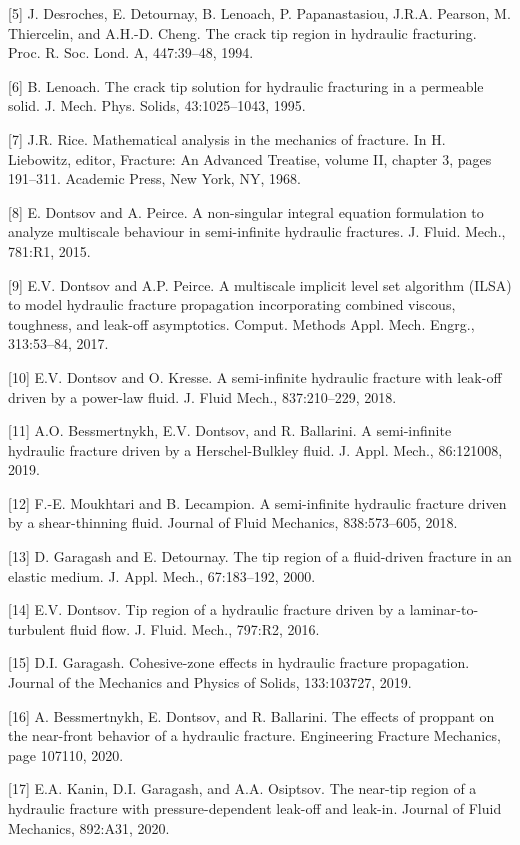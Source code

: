 \documentclass[main.tex]{subfiles}
\begin{document}
[5] J. Desroches, E. Detournay, B. Lenoach, P. Papanastasiou, J.R.A. Pearson, M. Thiercelin, and A.H.-D. Cheng. The crack tip region in hydraulic fracturing. Proc. R. Soc. Lond. A, 447:39–48, 1994.

[6] B. Lenoach. The crack tip solution for hydraulic fracturing in a permeable solid. J. Mech. Phys. Solids, 43:1025–1043, 1995.

[7] J.R. Rice. Mathematical analysis in the mechanics of fracture. In H. Liebowitz, editor, Fracture: An Advanced Treatise, volume II, chapter 3, pages 191–311. Academic Press, New York, NY, 1968.

[8] E. Dontsov and A. Peirce. A non-singular integral equation formulation to analyze multiscale behaviour in semi-infinite hydraulic fractures. J. Fluid. Mech., 781:R1, 2015.

[9] E.V. Dontsov and A.P. Peirce. A multiscale implicit level set algorithm (ILSA) to model hydraulic fracture propagation incorporating combined viscous, toughness, and leak-off asymptotics. Comput. Methods Appl. Mech. Engrg., 313:53–84, 2017.

[10] E.V. Dontsov and O. Kresse. A semi-infinite hydraulic fracture with leak-off driven by a power-law fluid. J. Fluid Mech., 837:210–229, 2018.

[11] A.O. Bessmertnykh, E.V. Dontsov, and R. Ballarini. A semi-infinite hydraulic fracture driven by a Herschel-Bulkley fluid. J. Appl. Mech., 86:121008, 2019.

[12] F.-E. Moukhtari and B. Lecampion. A semi-infinite hydraulic fracture driven by a shear-thinning fluid. Journal of Fluid Mechanics, 838:573–605, 2018.

[13] D. Garagash and E. Detournay. The tip region of a fluid-driven fracture in an elastic medium. J. Appl. Mech., 67:183–192, 2000.

[14] E.V. Dontsov. Tip region of a hydraulic fracture driven by a laminar-to-turbulent fluid flow. J. Fluid. Mech., 797:R2, 2016.

[15] D.I. Garagash. Cohesive-zone effects in hydraulic fracture propagation. Journal of the Mechanics and Physics of Solids, 133:103727, 2019.

[16] A. Bessmertnykh, E. Dontsov, and R. Ballarini. The effects of proppant on the near-front behavior of a hydraulic fracture. Engineering Fracture Mechanics, page 107110, 2020.

[17] E.A. Kanin, D.I. Garagash, and A.A. Osiptsov. The near-tip region of a hydraulic fracture with pressure-dependent leak-off and leak-in. Journal of Fluid Mechanics, 892:A31, 2020.
\end{document}
